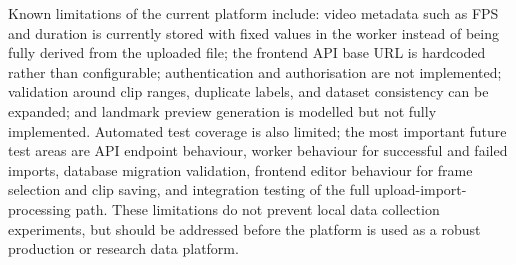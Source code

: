 Known limitations of the current platform include: video metadata such as FPS
and duration is currently stored with fixed values in the worker instead of
being fully derived from the uploaded file; the frontend API base URL is
hardcoded rather than configurable; authentication and authorisation are not
implemented; validation around clip ranges, duplicate labels, and dataset
consistency can be expanded; and landmark preview generation is modelled but not
fully implemented. Automated test coverage is also limited; the most important
future test areas are API endpoint behaviour, worker behaviour for successful
and failed imports, database migration validation, frontend editor behaviour for
frame selection and clip saving, and integration testing of the full
upload-import-processing path. These limitations do not prevent local data
collection experiments, but should be addressed before the platform is used as a
robust production or research data platform.

